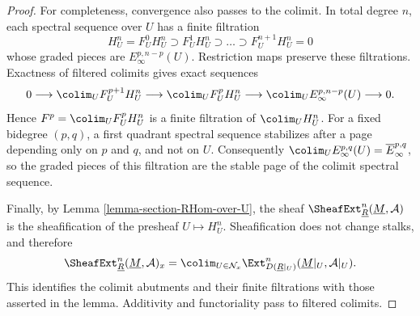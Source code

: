 \begin{proof}
For completeness, convergence also passes to the colimit. In total degree
$n$, each spectral sequence over $U$ has a finite filtration
$$
H_U^n = F_U^0H_U^n \supset F_U^1H_U^n \supset \ldots
\supset F_U^{n + 1}H_U^n = 0
$$
whose graded pieces are $E_\infty^{p, n - p}(U)$. Restriction maps preserve
these filtrations. Exactness of filtered colimits gives exact sequences
$$
0 \longrightarrow \colim_U F_U^{p + 1}H_U^n
\longrightarrow \colim_U F_U^pH_U^n
\longrightarrow \colim_U E_\infty^{p, n - p}(U)
\longrightarrow 0.
$$
Hence $F^p = \colim_U F_U^pH_U^n$ is a finite filtration of
$\colim_U H_U^n$. For a fixed bidegree $(p, q)$, a first quadrant spectral
sequence stabilizes after a page depending only on $p$ and $q$, and not on
$U$. Consequently
$\colim_U E_\infty^{p, q}(U) = \overline E_\infty^{p, q}$, so the graded
pieces of this filtration are the stable page of the colimit spectral
sequence.

Finally, by Lemma \ref{lemma-section-RHom-over-U}, the sheaf
$\SheafExt^n_{\underline{R}}(\underline{M}, \mathcal{A})$ is the
sheafification of the presheaf $U \mapsto H_U^n$. Sheafification does not
change stalks, and therefore
\begin{equation}
\label{equation-constant-sheaf-ext-stalk-colimit}
\SheafExt^n_{\underline{R}}(\underline{M}, \mathcal{A})_x
= \colim_{U \in \mathcal{N}_x}
\Ext^n_{D(\underline{R}|_U)}
(\underline{M}|_U, \mathcal{A}|_U).
\end{equation}
This identifies the colimit abutments and their finite filtrations with
those asserted in the lemma. Additivity and functoriality pass to filtered
colimits.
\end{proof}


